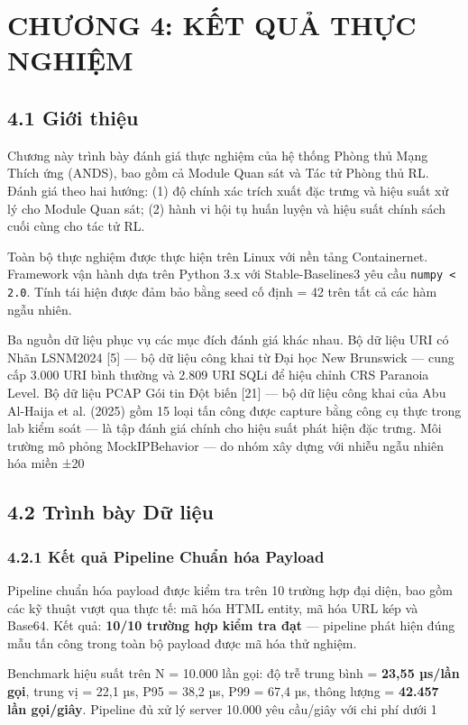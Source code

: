 \documentclass[12pt,a4paper,twoside]{report}
\begin{document}
{{\chapter*{CHƯƠNG 4: KẾT QUẢ THỰC NGHIỆM}

\section{4.1 Giới thiệu}

Chương này trình bày đánh giá thực nghiệm của hệ thống Phòng thủ Mạng Thích ứng (ANDS), bao gồm cả Module Quan sát và Tác tử Phòng thủ RL. Đánh giá theo hai hướng: (1) độ chính xác trích xuất đặc trưng và hiệu suất xử lý cho Module Quan sát; (2) hành vi hội tụ huấn luyện và hiệu suất chính sách cuối cùng cho tác tử RL.

Toàn bộ thực nghiệm được thực hiện trên Linux với nền tảng Containernet. Framework vận hành dựa trên Python 3.x với Stable-Baselines3 yêu cầu \texttt{numpy < 2.0}. Tính tái hiện được đảm bảo bằng seed cố định = 42 trên tất cả các hàm ngẫu nhiên.

Ba nguồn dữ liệu phục vụ các mục đích đánh giá khác nhau. Bộ dữ liệu URI có Nhãn LSNM2024 [5] — bộ dữ liệu công khai từ Đại học New Brunswick — cung cấp 3.000 URI bình thường và 2.809 URI SQLi để hiệu chỉnh CRS Paranoia Level. Bộ dữ liệu PCAP Gói tin Đột biến [21] — bộ dữ liệu công khai của Abu Al-Haija et al. (2025) gồm 15 loại tấn công được capture bằng công cụ thực trong lab kiểm soát — là tập đánh giá chính cho hiệu suất phát hiện đặc trưng. Môi trường mô phỏng MockIPBehavior — do nhóm xây dựng với nhiễu ngẫu nhiên hóa miền ±20%


\section{4.2 Trình bày Dữ liệu}

\subsection{4.2.1 Kết quả Pipeline Chuẩn hóa Payload}

Pipeline chuẩn hóa payload được kiểm tra trên 10 trường hợp đại diện, bao gồm các kỹ thuật vượt qua thực tế: mã hóa HTML entity, mã hóa URL kép và Base64. Kết quả: \textbf{10/10 trường hợp kiểm tra đạt} — pipeline phát hiện đúng mẫu tấn công trong toàn bộ payload được mã hóa thử nghiệm.

Benchmark hiệu suất trên N = 10.000 lần gọi: độ trễ trung bình = \textbf{23,55 µs/lần gọi}, trung vị = 22,1 µs, P95 = 38,2 µs, P99 = 67,4 µs, thông lượng = \textbf{42.457 lần gọi/giây}. Pipeline đủ xử lý server 10.000 yêu cầu/giây với chi phí dưới 1%

}}
\end{document}
